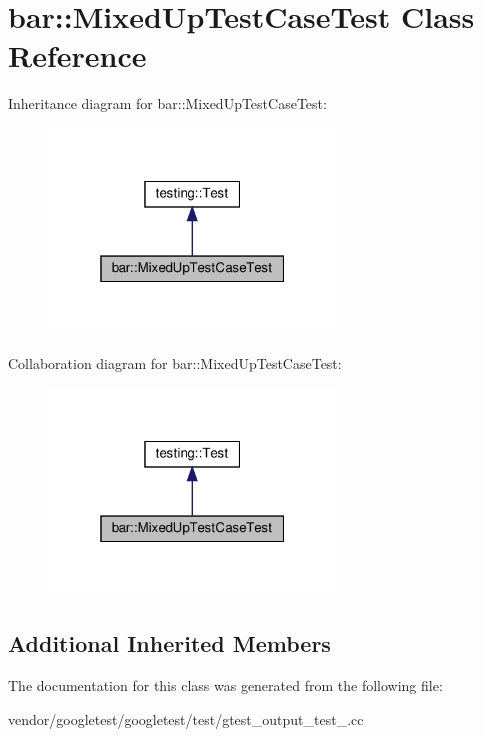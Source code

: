 \hypertarget{classbar_1_1_mixed_up_test_case_test}{}\section{bar\+:\+:Mixed\+Up\+Test\+Case\+Test Class Reference}
\label{classbar_1_1_mixed_up_test_case_test}


Inheritance diagram for bar\+:\+:Mixed\+Up\+Test\+Case\+Test\+:
\nopagebreak
\begin{figure}[H]
\begin{center}
\leavevmode
\includegraphics[width=217pt]{classbar_1_1_mixed_up_test_case_test__inherit__graph}
\end{center}
\end{figure}


Collaboration diagram for bar\+:\+:Mixed\+Up\+Test\+Case\+Test\+:
\nopagebreak
\begin{figure}[H]
\begin{center}
\leavevmode
\includegraphics[width=217pt]{classbar_1_1_mixed_up_test_case_test__coll__graph}
\end{center}
\end{figure}
\subsection*{Additional Inherited Members}


The documentation for this class was generated from the following file\+:\begin{DoxyCompactItemize}
\item 
vendor/googletest/googletest/test/gtest\+\_\+output\+\_\+test\+\_\+.\+cc\end{DoxyCompactItemize}
